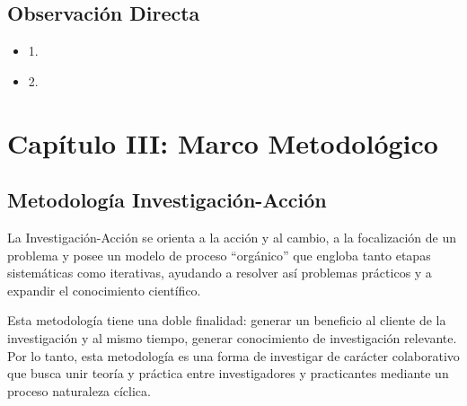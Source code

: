 \documentclass[12pt, a4paper]{article}
\begin{document}
\subsection{Observaci\'{o}n Directa}
	\begin{itemize}
		\item 1.
		\item 2.
	\end{itemize}
\pagebreak
\section{Cap\'{i}tulo III: Marco Metodol\'{o}gico}
	\subsection{Metodolog\'{i}a Investigaci\'{o}n-Acci\'{o}n}
	La Investigaci\'{o}n-Acci\'{o}n se orienta a la acci\'{o}n y al cambio, a la focalizaci\'{o}n de un problema y posee un modelo de proceso ``org\'{a}nico'' que engloba tanto etapas sistem\'{a}ticas como iterativas, ayudando a resolver as\'{i} problemas pr\'{a}cticos y a expandir el conocimiento cient\'{i}fico.

	Esta metodolog\'{i}a tiene una doble finalidad: generar un beneficio al cliente de la investigaci\'{o}n y al mismo tiempo, generar conocimiento de investigaci\'{o}n relevante. Por lo tanto, esta metodolog\'{i}a es una forma de investigar de car\'{a}cter colaborativo que busca unir teor\'{i}a y pr\'{a}ctica entre investigadores y practicantes mediante un proceso naturaleza c\'{i}clica.
\end{document}
